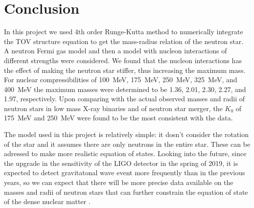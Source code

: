 \documentclass[draft,11pt]{article}
\theoremstyle{definition}
\theoremstyle{remark}
\begin{document}
    \section{Conclusion}
        In this project we used 4th order Runge-Kutta method to numerically integrate the TOV structure equation to get the mass-radius relation of the neutron star. A neutron Fermi gas model and then a model with nucleon interactions of different strengths were considered. We found that the nucleon interactions has the effect of making the neutron star stiffer, thus increasing the maximum mass. For nuclear compressibilities of \SI{100}{\mega\electronvolt}, \SI{175}{\mega\electronvolt}, \SI{250}{\mega\electronvolt}, \SI{325}{\mega\electronvolt}, and \SI{400}{\mega\electronvolt} the maximum masses were determined to be \SI{1.36}{\solarmass}, \SI{2.01}{\solarmass}, \SI{2.30}{\solarmass}, \SI{2.27}{\solarmass}, and \SI{1.97}{\solarmass}, respectively. Upon comparing with the actual observed masses and radii of neutron stars in low mass X-ray binaries and of neutron star merger, the $K_0$ of \SI{175}{\mega\electronvolt} and \SI{250}{\mega\electronvolt} were found to be the most consistent with the data.
        
        The model used in this project is relatively simple: it dosn't consider the rotation of the star and it assumes there are only neutrons in the entire star. These can be adressed to make more realistic equation of states. Looking into the future, since the upgrade in the sensitivity of the LIGO detector in the spring of 2019, it is expected to detect gravitatonal wave event more frequently than in the previous years, so we can expect that there will be more precise data available on the masses  and radii of neutron stars that can further constrain the equation of state of the dense nuclear matter \cite{ligo.update.2019}.
    
    \printbibliography
\end{document}
